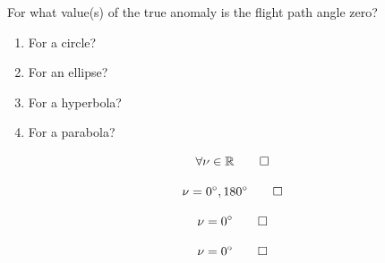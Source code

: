 \begin{hwkProblem}{1}{}
	

\end{hwkProblem}

\begin{hwkProblem}{2}{}
	
	For what value(s) of the true anomaly is the flight path angle zero?
	\begin{enumerate}
		\item For a circle?
		\item For an ellipse?
		\item For a hyperbola?
		\item For a parabola?
	\end{enumerate}
	
	\hwkSol

	\hwkPart

	\[
		\forall \nu \in \mathbb{R} \qed
	\]

	\hwkPart
	\[
		\nu = \qty{0}{\degree}, \qty{180}{\degree} \qed
	\]

	\hwkPart
	\[
		\nu = \qty{0}{\degree} \qed
	\]

	\hwkPart
	\[
		\nu = \qty{0}{\degree} \qed
	\]
	
\end{hwkProblem}

